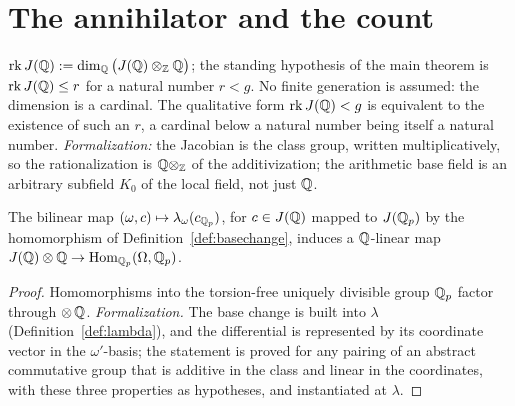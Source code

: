 \chapter{The annihilator and the count}

\begin{definition}
\label{def:rank-hyp}
\leanok
{}
$\operatorname{rk} J(\mathbb{Q}) := \dim_{\mathbb{Q}} \big(J(\mathbb{Q}) \otimes_{\mathbb{Z}} \mathbb{Q}\big)$; the
standing hypothesis of the main theorem is $\operatorname{rk} J(\mathbb{Q}) \le r$ for a natural
number $r < g$. No finite generation is assumed: the dimension is a cardinal. The
qualitative form $\operatorname{rk} J(\mathbb{Q}) < g$ is equivalent to the existence of such an
$r$, a cardinal below a natural number being itself a natural number.
\emph{Formalization:} the Jacobian is the class group, written multiplicatively, so the
rationalization is $\mathbb{Q} \otimes_{\mathbb{Z}}$ of the additivization; the arithmetic base field
is an arbitrary subfield $K_0$ of the local field, not just $\mathbb{Q}$.
\end{definition}

\begin{lemma}
\label{lem:eval-factors}
\leanok
{}
The bilinear map $(\omega, c) \mapsto \lambda_\omega(c_{\mathbb{Q}_p})$, for $c \in J(\mathbb{Q})$
mapped to $J(\mathbb{Q}_p)$ by the homomorphism of Definition~\ref{def:basechange}, induces a
$\mathbb{Q}$-linear map
$J(\mathbb{Q}) \otimes \mathbb{Q} \to \operatorname{Hom}_{\mathbb{Q}_p}(\Omega, \mathbb{Q}_p)$.
\end{lemma}
\begin{proof}
\leanok
Homomorphisms into the torsion-free uniquely divisible group $\mathbb{Q}_p$ factor through
$\otimes\,\mathbb{Q}$. \emph{Formalization.} The base change is built into $\lambda$
(Definition~\ref{def:lambda}), and the differential is represented by its coordinate
vector in the $\omega'$-basis; the statement is proved for any pairing of an abstract
commutative group that is additive in the class and linear in the coordinates, with
these three properties as hypotheses, and instantiated at $\lambda$.
\end{proof}

